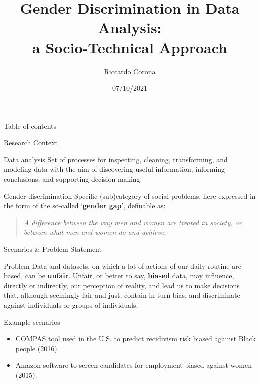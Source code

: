 \documentclass[usenames,dvipsnames]{beamer}
\title{Gender Discrimination in Data Analysis:\\a Socio-Technical Approach}
\author{Riccardo Corona}
\date{07/10/2021}
\begin{document}
    \begin{frame}
        \maketitle
    \end{frame}
    
    
    \begin{frame}{Table of contents}
      \tableofcontents
    \end{frame}
    
    
    \begin{frame}{Research Context}
        \begin{block}{Data analysis}
            Set of processes for inspecting, cleaning, transforming, and modeling data with the aim of discovering useful information, informing conclusions, and supporting decision making.
        \end{block}
        \begin{block}{Gender discrimination}
            Specific (sub)category of social problems, here expressed in the form of the so-called `\textbf{gender gap}', definable as:
            \begin{quote}
            \emph{A difference between the way men and women are treated in society, or between what men and women do and achieve.}
            \end{quote}
        \end{block}
    \end{frame}
    
    
    \begin{frame}{Scenarios \& Problem Statement}
        \begin{block}{Problem}
            Data and datasets, on which a lot of actions of our daily routine are based, can be \textbf {unfair}. Unfair, or better to say, \textbf{biased} data, may influence, directly or indirectly, our perception of reality, and lead us to make decisions that, although seemingly fair and just, contain in turn bias, and discriminate against individuals or groups of individuals.
        \end{block}
        \begin{exampleblock}{Example scenarios}
            \begin{itemize}
                \item \textcolor{greenPolimi}{COMPAS} tool used in the U.S. to predict recidivism risk biased against Black people (2016).
                \item \textcolor{greenPolimi}{Amazon} software to screen candidates for employment biased against women (2015).
            \end{itemize}
        \end{exampleblock}
    \end{frame}
    
\end{document}
